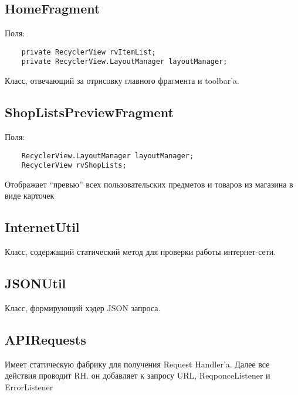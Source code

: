 \subsection{HomeFragment}
Поля:\\
\begin{small}
    \begin{verbatim}
    private RecyclerView rvItemList;
    private RecyclerView.LayoutManager layoutManager;
    \end{verbatim}
\end{small}
Класс, отвечающий за отрисовку главного фрагмента и toolbar'a.


\subsection{ShopListsPreviewFragment}
Поля:\\
\begin{small}
    \begin{verbatim}
    RecyclerView.LayoutManager layoutManager;
    RecyclerView rvShopLists;
    \end{verbatim}
\end{small}
Отображает ``превью'' всех пользовательских предметов и товаров из магазина в
виде карточек


\subsection{InternetUtil}
Класс, содержащий статический метод для проверки работы интернет-сети.

\subsection{JSONUtil}
Класс, формирующий хэдер JSON запроса.

\subsection{APIRequests}
Имеет статическую фабрику для получения Request Handler'a. Далее все действия
проводит RH. он добавляет к запросу URL, ReqponceListener и ErrorListener

